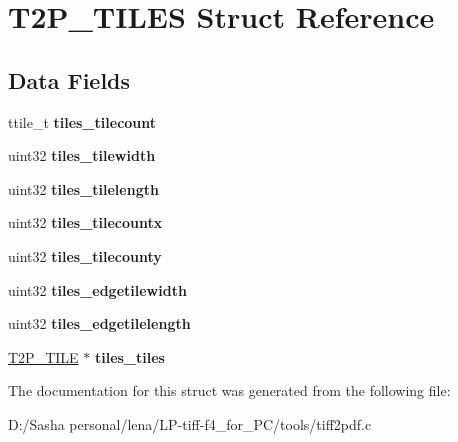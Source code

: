 \hypertarget{struct_t2_p___t_i_l_e_s}{}\section{T2\+P\+\_\+\+T\+I\+L\+E\+S Struct Reference}
\label{struct_t2_p___t_i_l_e_s}
\subsection*{Data Fields}
\begin{DoxyCompactItemize}
\item 
\hypertarget{struct_t2_p___t_i_l_e_s_a5e69edd9e6b9de765e16759ca84676e8}{}ttile\+\_\+t {\bfseries tiles\+\_\+tilecount}\label{struct_t2_p___t_i_l_e_s_a5e69edd9e6b9de765e16759ca84676e8}

\item 
\hypertarget{struct_t2_p___t_i_l_e_s_a5ac25f9e1d5a119dd355bd05e77f9abc}{}uint32 {\bfseries tiles\+\_\+tilewidth}\label{struct_t2_p___t_i_l_e_s_a5ac25f9e1d5a119dd355bd05e77f9abc}

\item 
\hypertarget{struct_t2_p___t_i_l_e_s_a6e1dbc713cab569a66f681670e361942}{}uint32 {\bfseries tiles\+\_\+tilelength}\label{struct_t2_p___t_i_l_e_s_a6e1dbc713cab569a66f681670e361942}

\item 
\hypertarget{struct_t2_p___t_i_l_e_s_a691fea74451b191e3841d366ae83132f}{}uint32 {\bfseries tiles\+\_\+tilecountx}\label{struct_t2_p___t_i_l_e_s_a691fea74451b191e3841d366ae83132f}

\item 
\hypertarget{struct_t2_p___t_i_l_e_s_aaa98117c84d3a90084af535e6c649425}{}uint32 {\bfseries tiles\+\_\+tilecounty}\label{struct_t2_p___t_i_l_e_s_aaa98117c84d3a90084af535e6c649425}

\item 
\hypertarget{struct_t2_p___t_i_l_e_s_ae114139fa99be80136cc96cc5afd7999}{}uint32 {\bfseries tiles\+\_\+edgetilewidth}\label{struct_t2_p___t_i_l_e_s_ae114139fa99be80136cc96cc5afd7999}

\item 
\hypertarget{struct_t2_p___t_i_l_e_s_ab30238c47fd13ba45c56efd0cc292238}{}uint32 {\bfseries tiles\+\_\+edgetilelength}\label{struct_t2_p___t_i_l_e_s_ab30238c47fd13ba45c56efd0cc292238}

\item 
\hypertarget{struct_t2_p___t_i_l_e_s_a7001b99cd3ae09c87e125a63c310c2ed}{}\hyperlink{struct_t2_p___t_i_l_e}{T2\+P\+\_\+\+T\+I\+L\+E} $\ast$ {\bfseries tiles\+\_\+tiles}\label{struct_t2_p___t_i_l_e_s_a7001b99cd3ae09c87e125a63c310c2ed}

\end{DoxyCompactItemize}


The documentation for this struct was generated from the following file\+:\begin{DoxyCompactItemize}
\item 
D\+:/\+Sasha personal/lena/\+L\+P-\/tiff-\/f4\+\_\+for\+\_\+\+P\+C/tools/tiff2pdf.\+c\end{DoxyCompactItemize}
